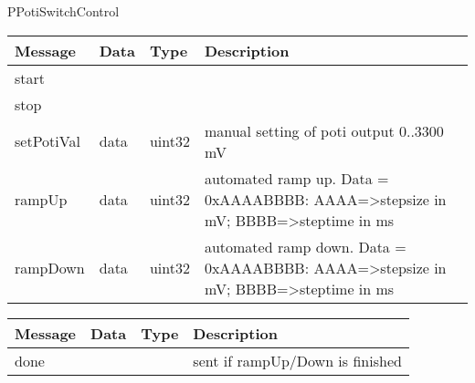  {PPotiSwitchControl}

\begin{tabular}[ht]{|l|l|l|p{8cm}|}
\hline
Message & Data & Type & Description\\
\hline
start &  &  & \\
\hline
stop &  &  & \\
\hline
setPotiVal &  data  &  uint32  & %
 manual setting of poti output 0..3300 mV
\\
\hline
rampUp &  data  &  uint32  & %
automated ramp up. Data = 0xAAAABBBB: AAAA=>stepsize in mV; BBBB=>steptime in ms 
\\
\hline
rampDown &  data  &  uint32  & %
automated ramp down. Data = 0xAAAABBBB: AAAA=>stepsize in mV; BBBB=>steptime in ms 
\\
\hline
\end{tabular}
\begin{tabular}[ht]{|l|l|l|p{8cm}|}
\hline
Message & Data & Type & Description\\
\hline
done &  &  & %
sent if rampUp/Down is finished
\\
\hline
\end{tabular}
